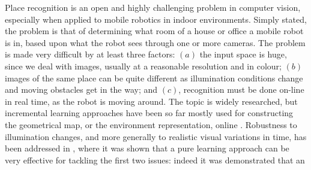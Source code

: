 Place recognition is an open and highly challenging problem in
computer vision, especially when applied to mobile robotics in indoor
environments. Simply stated, the problem is that of determining what
room of a house or office a mobile robot is in, based upon what the
robot sees through one or more cameras. The problem is made very
difficult by at least three factors: $(a)$ the input space is huge,
since we deal with images, usually at a reasonable resolution and in
colour; $(b)$ images of the same place can be quite different as
illumination conditions change and moving obstacles get in the way;
and $(c)$, recognition must be done on-line in real time, as the robot
is moving around. The topic is widely researched, but incremental
learning approaches have been so far mostly used for constructing the
geometrical map, or the environment representation,
online \cite{emma:irca05, ljubjiana:icra02}. Robustness to illumination
changes, and more generally to realistic visual variations in time,
has been addressed in \cite{pronobis:iros06}, where it was shown that
a pure learning approach can be very effective
for tackling the first two issues: indeed it was demonstrated that an
